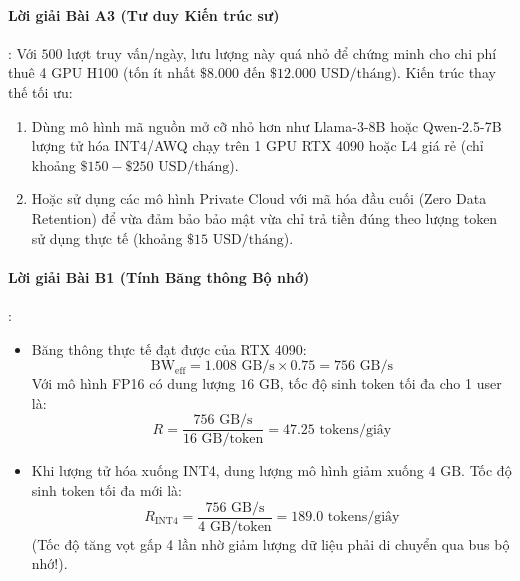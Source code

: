 \paragraph{Lời giải Bài A3 (Tư duy Kiến trúc sư)}:
Với $500$ lượt truy vấn/ngày, lưu lượng này quá nhỏ để chứng minh cho chi phí thuê 4 GPU H100 (tốn ít nhất $\$8.000$ đến $\$12.000\text{ USD/tháng}$).
Kiến trúc thay thế tối ưu:
\begin{enumerate}
  \item Dùng mô hình mã nguồn mở cỡ nhỏ hơn như Llama-3-8B hoặc Qwen-2.5-7B lượng tử hóa INT4/AWQ chạy trên 1 GPU RTX 4090 hoặc L4 giá rẻ (chỉ khoảng $\$150 - \$250\text{ USD/tháng}$).
  \item Hoặc sử dụng các mô hình Private Cloud với mã hóa đầu cuối (Zero Data Retention) để vừa đảm bảo bảo mật vừa chỉ trả tiền đúng theo lượng token sử dụng thực tế (khoảng $\$15\text{ USD/tháng}$).
\end{enumerate}

\paragraph{Lời giải Bài B1 (Tính Băng thông Bộ nhớ)}:
\begin{itemize}
  \item[a)] Băng thông thực tế đạt được của RTX 4090:
  \begin{equation*}
  \text{BW}_{\text{eff}} = 1.008\text{ GB/s} \times 0.75 = 756\text{ GB/s}
  \end{equation*}
  Với mô hình FP16 có dung lượng $16\text{ GB}$, tốc độ sinh token tối đa cho 1 user là:
  \begin{equation*}
  R = \frac{756\text{ GB/s}}{16\text{ GB/token}} = 47.25\text{ tokens/giây}
  \end{equation*}
  \item[b)] Khi lượng tử hóa xuống INT4, dung lượng mô hình giảm xuống $4\text{ GB}$. Tốc độ sinh token tối đa mới là:
  \begin{equation*}
  R_{\text{INT4}} = \frac{756\text{ GB/s}}{4\text{ GB/token}} = 189.0\text{ tokens/giây}
  \end{equation*}
  (Tốc độ tăng vọt gấp 4 lần nhờ giảm lượng dữ liệu phải di chuyển qua bus bộ nhớ!).
\end{itemize}

